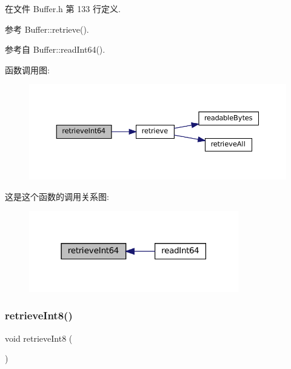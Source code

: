 在文件 Buffer.\+h 第 133 行定义.



参考 Buffer\+::retrieve().



参考自 Buffer\+::read\+Int64().

函数调用图\+:
\nopagebreak
\begin{figure}[H]
\begin{center}
\leavevmode
\includegraphics[width=350pt]{classmuduo_1_1net_1_1Buffer_a31eaec053434837ca42b6abc4319f0ee_cgraph}
\end{center}
\end{figure}
这是这个函数的调用关系图\+:
\nopagebreak
\begin{figure}[H]
\begin{center}
\leavevmode
\includegraphics[width=259pt]{classmuduo_1_1net_1_1Buffer_a31eaec053434837ca42b6abc4319f0ee_icgraph}
\end{center}
\end{figure}
\mbox{\label{classmuduo_1_1net_1_1Buffer_a4605c83f07f06cc12d0ab3a2d54be43e}} 
\subsubsection{\texorpdfstring{retrieve\+Int8()}{retrieveInt8()}}
{\footnotesize\ttfamily void retrieve\+Int8 (\begin{DoxyParamCaption}{ }\end{DoxyParamCaption})\hspace{0.3cm}{\ttfamily [inline]}}



